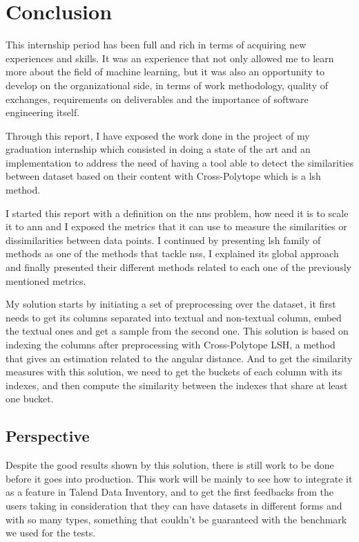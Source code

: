 \chapter*{Conclusion}

This internship period has been full and rich in terms of acquiring new
experiences and skills. It was an experience that not only allowed me to learn
more about the field of machine learning, but it was also an opportunity to
develop on the organizational side, in terms of work methodology, quality of
exchanges, requirements on deliverables and the importance of software
engineering itself. 


Through this report, I have exposed the work done in the project of my graduation
internship which consisted in doing a state of the art and an implementation to
address the need of having a tool able to detect the similarities between
dataset based on their content with Cross-Polytope which is a \acrfull{lsh}
method.

I started this report with a definition on the \acrfull{nns} problem, how need
it is to scale it to \acrfull{ann} and I exposed the metrics that it can use to
measure the similarities or dissimilarities between data points. I continued by
presenting \acrshort{lsh} family of methods as one of the methods that tackle
\acrshort{nss}, I explained its global approach and finally presented their
different methods related to each one of the previously mentioned metrics.

My solution starts by initiating a set of preprocessing over the dataset, it
first needs to get its columns separated into textual and non-textual column,
embed the textual ones and get a sample from the second one. This solution is
based on indexing the columns after preprocessing with Cross-Polytope LSH, a
method that gives an estimation related to the angular distance. And to get the
similarity measures with this solution, we need to get the buckets of each
column with its indexes, and then compute the similarity between the indexes that share at least one bucket.


\section*{Perspective}
Despite the good results shown by this solution, there is still work to be done
before it goes into production. This work will be mainly to see how to integrate
it as a feature in Talend Data Inventory, and to get the first feedbacks from
the users taking in consideration that they can have datasets in different forms
and with so many types, something that couldn't be guaranteed with the benchmark
we used for the tests.